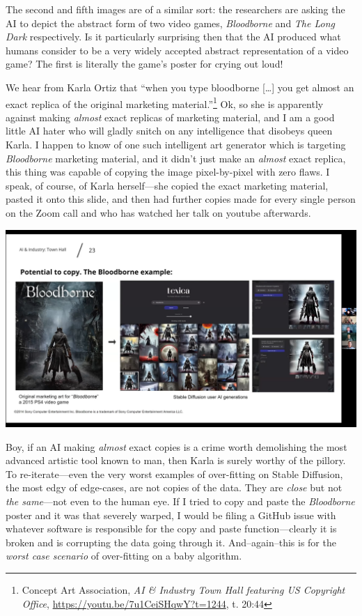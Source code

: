 \documentclass[11pt]{article}
\begin{document}
The second and fifth images are of a similar sort: the researchers are asking the AI to depict the abstract form of two video games, \emph{Bloodborne} and \emph{The Long Dark} respectively. Is it particularly surprising then that the AI produced what humans consider to be a very widely accepted abstract representation of a video game? The first is literally the game's poster for crying out loud!

We hear from Karla Ortiz that ``when you type bloodborne [\ldots{}] you get almost an exact replica of the original marketing material.''\footnote{Concept Art Association, \emph{AI \& Industry Town Hall featuring US Copyright Office}, \url{https://youtu.be/7u1CeiSHqwY?t=1244}, t. 20:44} Ok, so she is apparently against making \emph{almost} exact replicas of marketing material, and I am a good little AI hater who will gladly snitch on any intelligence that disobeys queen Karla. I happen to know of one such intelligent art generator which is targeting \emph{Bloodborne} marketing material, and it didn't just make an \emph{almost} exact replica, this thing was capable of copying the image pixel-by-pixel with zero flaws. I speak, of course, of Karla herself---she copied the exact marketing material, pasted it onto this slide, and then had further copies made for every single person on the Zoom call and who has watched her talk on youtube afterwards.

\begin{center}
\includegraphics[width=.9\linewidth]{./images/karla-slide.png}
\end{center}

Boy, if an AI making \emph{almost} exact copies is a crime worth demolishing the most advanced artistic tool known to man, then Karla is surely worthy of the pillory. To re-iterate---even the very worst examples of over-fitting on Stable Diffusion, the most edgy of edge-cases, are not copies of the data. They are \emph{close} but not \emph{the same}---not even to the human eye. If I tried to copy and paste the \emph{Bloodborne} poster and it was that severely warped, I would be filing a GitHub issue with whatever software is responsible for the copy and paste function---clearly it is broken and is corrupting the data going through it. And--again--this is for the \emph{worst case scenario} of over-fitting on a baby algorithm.
\end{document}
